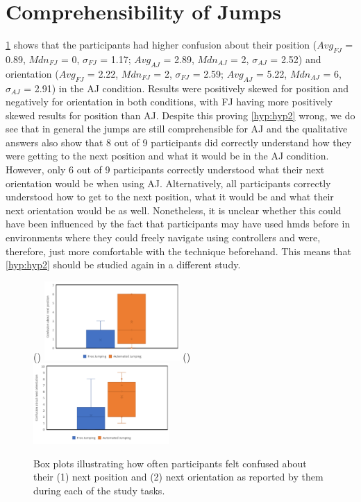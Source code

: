 \section{Comprehensibility of Jumps}
\label{subsection EUS: Comprehensibility of Jumps}
\cref{fig:jump-comprehensibility} shows that the participants had higher confusion about their position ($Avg_{FJ}$ = 0.89, $Mdn_{FJ}$ = 0, $\sigma_{FJ}$ = 1.17; $Avg_{AJ}$ = 2.89, $Mdn_{AJ}$ = 2, $\sigma_{AJ}$ = 2.52) and orientation ($Avg_{FJ}$ = 2.22, $Mdn_{FJ}$ = 2, $\sigma_{FJ}$ = 2.59; $Avg_{AJ}$ = 5.22, $Mdn_{AJ}$ = 6, $\sigma_{AJ}$ = 2.91) in the AJ condition. Results were positively skewed for position and negatively for orientation in both conditions, with FJ having more positively skewed results for position than AJ. 
Despite this proving \cref{hyp:hyp2} wrong, we do see that in general the jumps are still comprehensible for AJ and the qualitative answers also show that 8 out of 9 participants did correctly understand how they were getting to the next position and what it would be in the AJ condition. However, only 6 out of 9 participants correctly understood what their next orientation would be when using AJ. Alternatively, all participants correctly understood how to get to the next position, what it would be and what their next orientation would be as well. Nonetheless, it is unclear whether this could have been influenced by the fact that participants may have used \acrshort{hmd}s before in environments where they could freely navigate using controllers and were, therefore, just more comfortable with the technique beforehand. This means that \cref{hyp:hyp2} should be studied again in a different study.

\begin{figure}[]
	()
	\includegraphics[width=0.46\textwidth]{images/position.pdf}
	()
	\includegraphics[width=0.46\textwidth]{images/orientation.pdf}
	\caption{Box plots illustrating how often participants felt confused about their (1) next position and (2) next orientation as reported by them during each of the study tasks.}
	\label{fig:jump-comprehensibility}
\end{figure}

